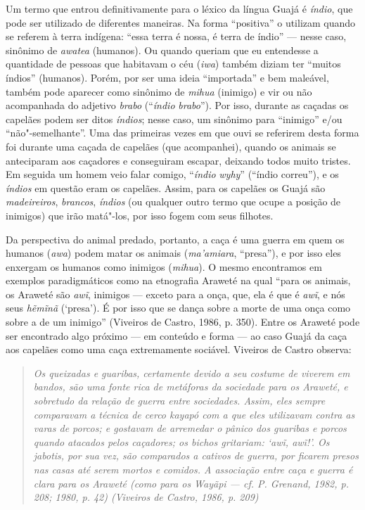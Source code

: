 Um termo que entrou definitivamente para o léxico da língua Guajá é
\emph{índio}, que pode ser utilizado de diferentes maneiras. Na forma
``positiva'' o utilizam quando se referem à terra indígena: ``essa terra é
nossa, é terra de índio'' --- nesse caso, sinônimo de \emph{awatea}
(humanos). Ou quando queriam que eu entendesse a quantidade de pessoas
que habitavam o céu (\emph{iwa}) também diziam ter ``muitos índios''
(humanos). Porém, por ser uma ideia ``importada'' e bem maleável, também
pode aparecer como sinônimo de \emph{mihua} (inimigo) e vir ou não
acompanhada do adjetivo \emph{brabo} (``\emph{índio} \emph{brabo}''). Por
isso, durante as caçadas os capelães podem ser ditos \emph{índios};
nesse caso, um sinônimo para ``inimigo'' e/ou ``não"-semelhante''. Uma das
primeiras vezes em que ouvi se referirem desta forma foi durante uma
caçada de capelães (que acompanhei), quando os animais se anteciparam
aos caçadores e conseguiram escapar, deixando todos muito tristes. Em
seguida um homem veio falar comigo, ``\emph{índio} \emph{wyhy}'' (``índio
correu''), e os \emph{índios} em questão eram os capelães. Assim, para os
capelães os Guajá são \emph{madeireiros}, \emph{brancos}, \emph{índios}
(ou qualquer outro termo que ocupe a posição de inimigos) que irão
matá"-los, por isso fogem com seus filhotes.

Da perspectiva do animal predado, portanto, a caça é uma guerra em quem
os humanos (\emph{awa}) podem matar os animais (\emph{ma'amiara},
``presa''), e por isso eles enxergam os humanos como inimigos
(\emph{mihua}). O mesmo encontramos em exemplos paradigmáticos como na
etnografia Araweté na qual ``para os animais, os Araweté são \emph{awĩ},
inimigos --- exceto para a onça, que, ela é que é \emph{awĩ}, e nós seus
\emph{hẽmĩnã} (`presa'). É por isso que se dança sobre a morte de uma
onça como sobre a de um inimigo'' (Viveiros de Castro, 1986, p. 350).
Entre os Araweté pode ser encontrado algo próximo --- em conteúdo e forma
--- ao caso Guajá da caça aos capelães como uma caça extremamente
sociável. Viveiros de Castro observa:

\begin{quote}
\emph{Os queixadas e guaribas, certamente devido a seu costume de viverem em
bandos, são uma fonte rica de metáforas da sociedade para os Araweté, e
sobretudo da relação de guerra entre sociedades. Assim, eles sempre
comparavam a técnica de cerco kayapó com a que eles utilizavam contra as
varas de porcos; e gostavam de arremedar o pânico dos guaribas e porcos
quando atacados pelos caçadores; os bichos gritariam: `\emph{awĩ},
\emph{awĩ}!'. Os jabotis, por sua vez, são comparados a cativos de
guerra, por ficarem presos nas casas até serem mortos e comidos. A
associação entre caça e guerra é clara para os Araweté (como para os
Wayãpi --- \emph{cf}. P. Grenand, 1982, p. 208; 1980, p. 42) (Viveiros de Castro,
1986, p. 209)}
\end{quote}

